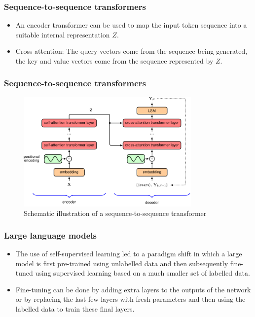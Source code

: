 \documentclass{beamer}
\begin{document}
\begin{frame}
    \frametitle{Sequence-to-sequence transformers}
    \begin{itemize}
        \item An encoder transformer can be used to map the input token sequence into a suitable internal representation $Z$.
        \item Cross attention: The query vectors come from the sequence being generated, the key and value vectors come from the sequence represented by $Z$.
    \end{itemize}
\end{frame}

\begin{frame}
    \frametitle{Sequence-to-sequence transformers}
    \begin{figure}
        \caption{Schematic illustration of a sequence-to-sequence transformer}
        \includegraphics[width=0.8\textwidth]{Figure_20.pdf}
    \end{figure}
\end{frame}

\begin{frame}
    \frametitle{Large language models}
    \begin{itemize}
        \item The use of self-supervised learning led to a paradigm shift in which a large model is first pre-trained using unlabelled data and then subsequently fine-tuned using supervised learning based on a much smaller set of labelled data.
        \item Fine-tuning can be done by adding extra layers to the outputs of the network or by replacing the last few layers with fresh parameters and then using the labelled data to train these final layers.
    \end{itemize}
\end{frame}
\end{document}
